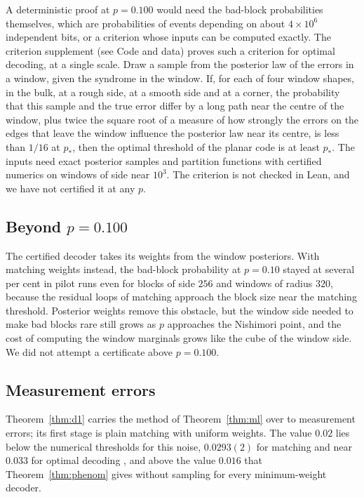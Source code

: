\documentclass[11pt]{amsart}
\theoremstyle{definition}
\theoremstyle{remark}
\numberwithin{equation}{section}
\begin{document}
A deterministic proof at $p=0.100$ would need the bad-block probabilities themselves, which are probabilities of events depending on about $4\times10^{6}$ independent bits, or a criterion whose inputs can be computed exactly. The criterion supplement (see Code and data) proves such a criterion for optimal decoding, at a single scale. Draw a sample from the posterior law of the errors in a window, given the syndrome in the window. If, for each of four window shapes, in the bulk, at a rough side, at a smooth side and at a corner, the probability that this sample and the true error differ by a long path near the centre of the window, plus twice the square root of a measure of how strongly the errors on the edges that leave the window influence the posterior law near its centre, is less than $1/16$ at $p_\ast$, then the optimal threshold of the planar code is at least $p_\ast$. The inputs need exact posterior samples and partition functions with certified numerics on windows of side near $10^3$. The criterion is not checked in Lean, and we have not certified it at any $p$.

\subsection{Beyond \texorpdfstring{$p=0.100$}{p = 0.100}}
The certified decoder takes its weights from the window posteriors. With matching weights instead, the bad-block probability at $p=0.10$ stayed at several per cent in pilot runs even for blocks of side $256$ and windows of radius $320$, because the residual loops of matching approach the block size near the matching threshold. Posterior weights remove this obstacle, but the window side needed to make bad blocks rare still grows as $p$ approaches the Nishimori point, and the cost of computing the window marginals grows like the cube of the window side. We did not attempt a certificate above $p=0.100$.

\subsection{Measurement errors}\label{sec:disc-meas}
Theorem~\ref{thm:d1} carries the method of Theorem~\ref{thm:ml} over to measurement errors; its first stage is plain matching with uniform weights. The value $0.02$ lies below the numerical thresholds for this noise, $0.0293(2)$ for matching \cite{WHP03} and near $0.033$ for optimal decoding \cite{OAIM04}, and above the value $0.016$ that Theorem~\ref{thm:phenom} gives without sampling for every minimum-weight decoder.
\end{document}
